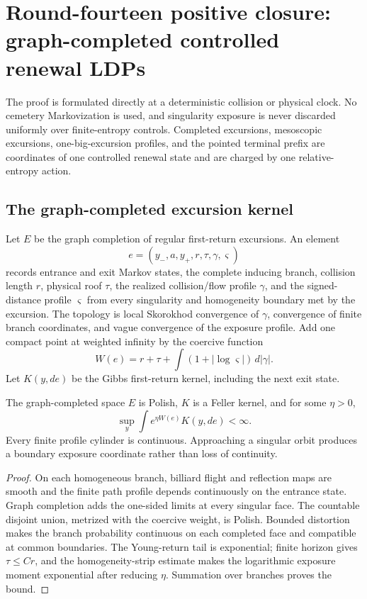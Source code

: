 
\section{Round-fourteen positive closure: graph-completed controlled renewal LDPs}
\label{sec:r14-a3}

The proof is formulated directly at a deterministic collision or physical
clock.  No cemetery Markovization is used, and singularity exposure is never
discarded uniformly over finite-entropy controls.  Completed excursions,
mesoscopic excursions, one-big-excursion profiles, and the pointed terminal
prefix are coordinates of one controlled renewal state and are charged by one
relative-entropy action.

\subsection{The graph-completed excursion kernel}

Let \(E\) be the graph completion of regular first-return excursions.  An
element
\[
 e=(y_-,a,y_+,r,\tau,\gamma,\varsigma)
\]
records entrance and exit Markov states, the complete inducing branch,
collision length \(r\), physical roof \(\tau\), the realized collision/flow
profile \(\gamma\), and the signed-distance profile \(\varsigma\) from every
singularity and homogeneity boundary met by the excursion.  The topology is
local Skorokhod convergence of \(\gamma\), convergence of finite branch
coordinates, and vague convergence of the exposure profile.  Add one compact
point at weighted infinity by the coercive function
\[
 W(e)=r+\tau+\int(1+|\log\varsigma|)\,d|\gamma|.
\]
Let \(K(y,de)\) be the Gibbs first-return kernel, including the next exit state.

\begin{lemma}
\label{lem:r14-a3-kernel}
The graph-completed space \(E\) is Polish, \(K\) is a Feller kernel, and for
some \(\eta>0\),
\[
 \sup_y\int e^{\eta W(e)}K(y,de)<\infty .
\]
Every finite profile cylinder is continuous.  Approaching a singular orbit
produces a boundary exposure coordinate rather than loss of continuity.
\end{lemma}

\begin{proof}
On each homogeneous branch, billiard flight and reflection maps are smooth
and the finite path profile depends continuously on the entrance state.
Graph completion adds the one-sided limits at every singular face.  The
countable disjoint union, metrized with the coercive weight, is Polish.
Bounded distortion makes the branch probability continuous on each completed
face and compatible at common boundaries.  The Young-return tail is
exponential; finite horizon gives \(\tau\le C r\), and the homogeneity-strip
estimate makes the logarithmic exposure moment exponential after reducing
\(\eta\).  Summation over branches proves the bound.
\end{proof}

